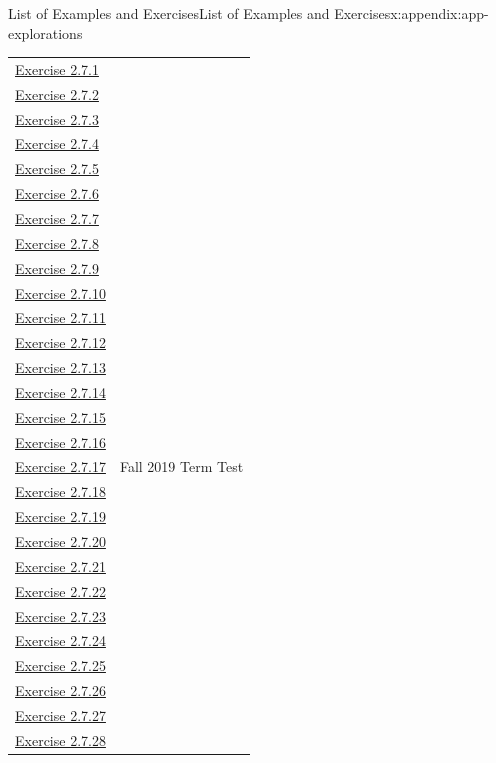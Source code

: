 \documentclass[oneside,10pt,]{book}
\numberwithin{equation}{section}
\begin{document}
\begin{appendixptx}{List of Examples and Exercises}{}{List of Examples and Exercises}{}{}{x:appendix:app-explorations}
\begin{longtable}[l]{ll}
\hyperlink{g:exercise:id527913}{Exercise 2.7.1}& \\
\hyperlink{g:exercise:id527955}{Exercise 2.7.2}& \\
\hyperlink{g:exercise:id528270}{Exercise 2.7.3}& \\
\hyperlink{g:exercise:id528246}{Exercise 2.7.4}& \\
\hyperlink{g:exercise:id528293}{Exercise 2.7.5}& \\
\hyperlink{g:exercise:id528354}{Exercise 2.7.6}& \\
\hyperlink{g:exercise:id528325}{Exercise 2.7.7}& \\
\hyperlink{g:exercise:id528408}{Exercise 2.7.8}& \\
\hyperlink{g:exercise:id528488}{Exercise 2.7.9}& \\
\hyperlink{g:exercise:id528524}{Exercise 2.7.10}& \\
\hyperlink{g:exercise:id528564}{Exercise 2.7.11}& \\
\hyperlink{x:exercise:divex-3x3-grid}{Exercise 2.7.12}& \\
\hyperlink{g:exercise:id528673}{Exercise 2.7.13}& \\
\hyperlink{g:exercise:id528735}{Exercise 2.7.14}& \\
\hyperlink{g:exercise:id528745}{Exercise 2.7.15}& \\
\hyperlink{g:exercise:id528794}{Exercise 2.7.16}& \\
\hyperlink{g:exercise:id528782}{Exercise 2.7.17}& Fall 2019 Term Test\\
\hyperlink{g:exercise:id528929}{Exercise 2.7.18}& \\
\hyperlink{g:exercise:id528917}{Exercise 2.7.19}& \\
\hyperlink{g:exercise:id528941}{Exercise 2.7.20}& \\
\hyperlink{g:exercise:id528971}{Exercise 2.7.21}& \\
\hyperlink{g:exercise:id528991}{Exercise 2.7.22}& \\
\hyperlink{g:exercise:id529014}{Exercise 2.7.23}& \\
\hyperlink{g:exercise:id529023}{Exercise 2.7.24}& \\
\hyperlink{g:exercise:id529051}{Exercise 2.7.25}& \\
\hyperlink{g:exercise:id529173}{Exercise 2.7.26}& \\
\hyperlink{g:exercise:id529172}{Exercise 2.7.27}& \\
\hyperlink{g:exercise:id529238}{Exercise 2.7.28}& \\

\end{longtable}
\end{appendixptx}
\end{document}
